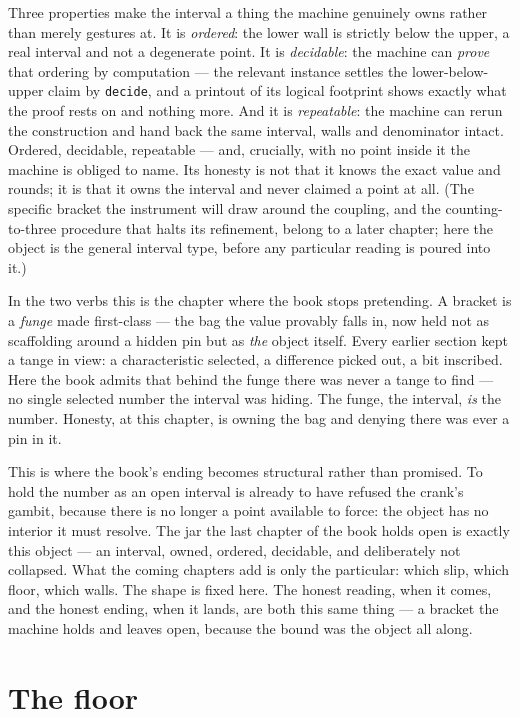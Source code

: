 Three properties make the interval a thing the machine genuinely owns rather than merely gestures at. It is
\emph{ordered}: the lower wall is strictly below the upper, a real interval and not a degenerate point. It is
\emph{decidable}: the machine can \emph{prove} that ordering by computation --- the relevant instance settles the
lower-below-upper claim by \verb|decide|, and a printout of its logical footprint shows exactly what the proof rests on
and nothing more. And it is \emph{repeatable}: the machine can rerun the construction and hand back the same interval,
walls and denominator intact. Ordered, decidable, repeatable --- and, crucially, with no point inside it the machine is
obliged to name. Its honesty is not that it knows the exact value and rounds; it is that it owns the interval and never
claimed a point at all. (The specific bracket the instrument will draw around the coupling, and the counting-to-three
procedure that halts its refinement, belong to a later chapter; here the object is the general interval type, before
any particular reading is poured into it.)

In the two verbs this is the chapter where the book stops pretending. A bracket is a \emph{funge} made first-class ---
the bag the value provably falls in, now held not as scaffolding around a hidden pin but as \emph{the} object itself.
Every earlier section kept a tange in view: a characteristic selected, a difference picked out, a bit inscribed. Here
the book admits that behind the funge there was never a tange to find --- no single selected number the interval was
hiding. The funge, the interval, \emph{is} the number. Honesty, at this chapter, is owning the bag and denying there
was ever a pin in it.

This is where the book's ending becomes structural rather than promised. To hold the number as an open interval is
already to have refused the crank's gambit, because there is no longer a point available to force: the object has no
interior it must resolve. The jar the last chapter of the book holds open is exactly this object --- an interval,
owned, ordered, decidable, and deliberately not collapsed. What the coming chapters add is only the particular: which
slip, which floor, which walls. The shape is fixed here. The honest reading, when it comes, and the honest ending, when
it lands, are both this same thing --- a bracket the machine holds and leaves open, because the bound was the object
all along.

\section{The floor}

